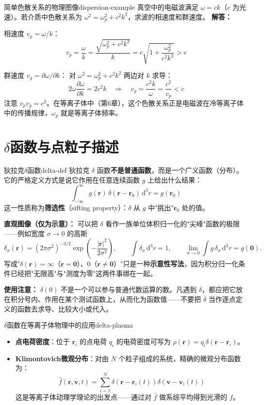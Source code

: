 \documentclass[12pt,a4paper,openany,oneside]{book}
\newcommand{\diff}{\mathrm{d}}
\newcommand{\vect}[1]{\bm{#1}}
\newcommand{\difficulty}[1]{\marginnote{\hfill\textcolor{coverMid!80}{\rule[-0.1em]{2pt}{0.9em}}\,\textcolor{coverMid}{\footnotesize\textbf{[#1]}}}}
\begin{document}
\begin{example}{简单色散关系的物理图像}{dispersion-example}
\difficulty{基础}
真空中的电磁波满足 $\omega = ck$（$c$ 为光速）。若介质中色散关系为 $\omega^2 = \omega_p^2 + c^2k^2$，求波的相速度和群速度。
\tcblower
\textbf{解答：}

相速度 $v_p = \omega/k$：
\[
v_p = \frac{\omega}{k} = \frac{\sqrt{\omega_p^2 + c^2k^2}}{k} = c\sqrt{1 + \frac{\omega_p^2}{c^2k^2}} > c
\]

群速度 $v_g = \partial\omega/\partial k$：
对 $\omega^2 = \omega_p^2 + c^2k^2$ 两边对 $k$ 求导：
\[
2\omega\frac{\partial\omega}{\partial k} = 2c^2 k \quad\Rightarrow\quad v_g = \frac{c^2 k}{\omega} = \frac{c^2}{v_p} < c
\]
注意 $v_p v_g = c^2$。在等离子体中（第6章），这个色散关系正是电磁波在冷等离子体中的传播规律，$\omega_p$ 就是等离子体频率。
\end{example}

\section{$\delta$函数与点粒子描述}\difficulty{基础}

\begin{definition}{狄拉克$\delta$函数}{delta-def}
狄拉克 $\delta$ 函数\textbf{不是普通函数}，而是一个广义函数（分布）。它的严格定义方式是说它作用在任意连续函数 $g$ 上给出什么结果：
\[
\boxed{\;\int_{-\infty}^{\infty} g(\vect{r})\,\delta(\vect{r}-\vect{r}_0)\,\diff^3r = g(\vect{r}_0)\;}
\]
这一性质称为\textbf{筛选性}（sifting property）：$\delta$ 从 $g$ 中"挑出"$\vect{r}_0$ 处的值。

\textbf{直观图像（仅为示意）：} 可以把 $\delta$ 看作一族单位体积归一化的"尖峰"函数的极限——例如宽度 $\sigma\to0$ 的高斯
\[
\delta_\sigma(\vect{r}) = (2\pi\sigma^2)^{-3/2}\exp\!\left(-\frac{|\vect{r}|^2}{2\sigma^2}\right),
\qquad \int \delta_\sigma\,\diff^3r = 1,
\qquad \lim_{\sigma\to0}\int g\,\delta_\sigma\,\diff^3r = g(\vect{0}).
\]
写成"$\delta(\vect{r})=\infty$（$\vect{r}=\vect{0}$）、$0$（$\vect{r}\ne\vect{0}$）"只是一种\textbf{示意性写法}，因为积分归一化条件已经把"无限高"与"测度为零"这两件事绑在一起。

\textbf{使用注意：} $\delta(0)$ 不是一个可以参与普通代数运算的数。凡遇到 $\delta$，都应把它放在积分号内、作用在某个测试函数上，从而化为函数值——不要把 $\delta$ 当作逐点定义的函数去求导、比较大小或代入。
\end{definition}

\begin{insight}{$\delta$函数在等离子体物理中的应用}{delta-plasma}
\begin{itemize}
\item \textbf{点电荷密度}：位于 $\vect{r}_i$ 的点电荷 $q_i$ 的电荷密度可写为 $\rho(\vect{r}) = q_i\delta(\vect{r}-\vect{r}_i)$。
\item \textbf{Klimontovich微观分布}：对由 $N$ 个粒子组成的系统，精确的微观分布函数为：
\[
\hat{f}(\vect{r},\vect{v},t) = \sum_{i=1}^{N} \delta(\vect{r} - \vect{r}_i(t)) \delta(\vect{v} - \vect{v}_i(t))
\]
这是等离子体动理学理论的出发点——通过对 $\hat{f}$ 做系综平均得到光滑的 $f$。
\end{itemize}
\end{insight}
\end{document}
